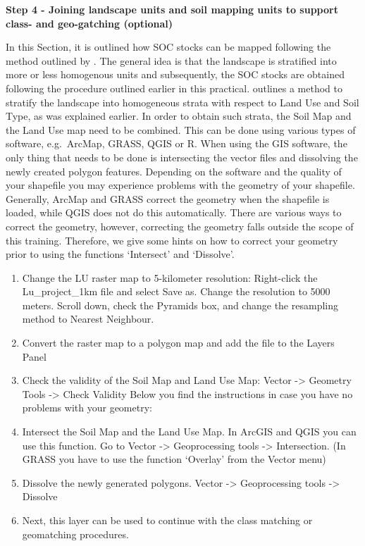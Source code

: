 \documentclass[10pt,b5paper,]{book}
\providecommand{\tightlist}{%
  \setlength{\itemsep}{0pt}\setlength{\parskip}{0pt}}
\theoremstyle{definition}
\theoremstyle{definition}
\theoremstyle{definition}
\theoremstyle{remark}
\begin{document}
\textbf{Step 4 - Joining landscape units and soil mapping units to
support class- and geo-gatching (optional)}

In this Section, it is outlined how SOC stocks can be mapped following
the method outlined by \cite{lettens2004soil}. The general idea is that
the landscape is stratified into more or less homogenous units and
subsequently, the SOC stocks are obtained following the procedure
outlined earlier in this practical. \cite{lettens2004soil} outlines a
method to stratify the landscape into homogeneous strata with respect to
Land Use and Soil Type, as was explained earlier. In order to obtain
such strata, the Soil Map and the Land Use map need to be combined. This
can be done using various types of software, e.g.~ArcMap, GRASS, QGIS or
R. When using the GIS software, the only thing that needs to be done is
intersecting the vector files and dissolving the newly created polygon
features. Depending on the software and the quality of your shapefile
you may experience problems with the geometry of your shapefile.
Generally, ArcMap and GRASS correct the geometry when the shapefile is
loaded, while QGIS does not do this automatically. There are various
ways to correct the geometry, however, correcting the geometry falls
outside the scope of this training. Therefore, we give some hints on how
to correct your geometry prior to using the functions `Intersect' and
`Dissolve'.

\begin{enumerate}
\def\labelenumi{\arabic{enumi}.}
\tightlist
\item
  Change the LU raster map to 5-kilometer resolution: Right-click the
  Lu\_project\_1km file and select Save as. Change the resolution to
  5000 meters. Scroll down, check the Pyramids box, and change the
  resampling method to Nearest Neighbour.
\item
  Convert the raster map to a polygon map and add the file to the Layers
  Panel
\item
  Check the validity of the Soil Map and Land Use Map: Vector
  -\textgreater{} Geometry Tools -\textgreater{} Check Validity Below
  you find the instructions in case you have no problems with your
  geometry:
\item
  Intersect the Soil Map and the Land Use Map. In ArcGIS and QGIS you
  can use this function. Go to Vector -\textgreater{} Geoprocessing
  tools -\textgreater{} Intersection. (In GRASS you have to use the
  function `Overlay' from the Vector menu)
\item
  Dissolve the newly generated polygons. Vector -\textgreater{}
  Geoprocessing tools -\textgreater{} Dissolve
\item
  Next, this layer can be used to continue with the class matching or
  geomatching procedures.
\end{enumerate}
\end{document}
